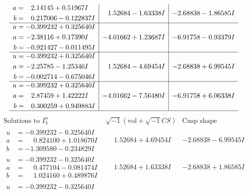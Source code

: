 \documentclass[1p]{elsarticle_modified}
\theoremstyle{definition}
\newcommand{\I}{\sqrt{-1}}
\begin{document}
$$\begin{array}{c|c|c}
\begin{aligned}
a &= \phantom{-}2.14145 + 0.51967 I \\
b &= \phantom{-}0.217006 - 0.122837 I\end{aligned}
 & \phantom{-}1.52684 - 1.63338 I & -2.68838 - 1.86585 I \\ \hline\begin{aligned}
u &= -0.399232 + 0.325640 I \\
a &= -2.38116 + 0.17390 I \\
b &= -0.921427 - 0.011495 I\end{aligned}
 & -4.01662 + 1.23687 I & -6.91758 - 0.93379 I \\ \hline\begin{aligned}
u &= -0.399232 + 0.325640 I \\
a &= -2.25785 - 1.25346 I \\
b &= -0.002714 - 0.675046 I\end{aligned}
 & \phantom{-}1.52684 - 4.69454 I & -2.68838 + 6.99545 I \\ \hline\begin{aligned}
u &= -0.399232 + 0.325640 I \\
a &= \phantom{-}2.87459 + 1.42222 I \\
b &= \phantom{-}0.300259 + 0.949883 I\end{aligned}
 & -4.01662 - 7.56480 I & -6.91758 + 6.06338 I\\
 \hline 
 \end{array}$$\newpage$$\begin{array}{c|c|c}  
\text{Solutions to }I^u_{3}& \I (\text{vol} + \sqrt{-1}CS) & \text{Cusp shape}\\
 \hline 
\begin{aligned}
u &= -0.399232 - 0.325640 I \\
a &= \phantom{-}0.824100 + 1.018670 I \\
b &= -1.309580 - 0.234829 I\end{aligned}
 & \phantom{-}1.52684 + 4.69454 I & -2.68838 - 6.99545 I \\ \hline\begin{aligned}
u &= -0.399232 - 0.325640 I \\
a &= \phantom{-}0.477104 - 0.081474 I \\
b &= \phantom{-}1.024160 + 0.489876 I\end{aligned}
 & \phantom{-}1.52684 + 1.63338 I & -2.68838 + 1.86585 I \\ \hline\begin{aligned}
u &= -0.399232 - 0.325640 I \\

\end{aligned}
\end{array}$$
\end{document}
